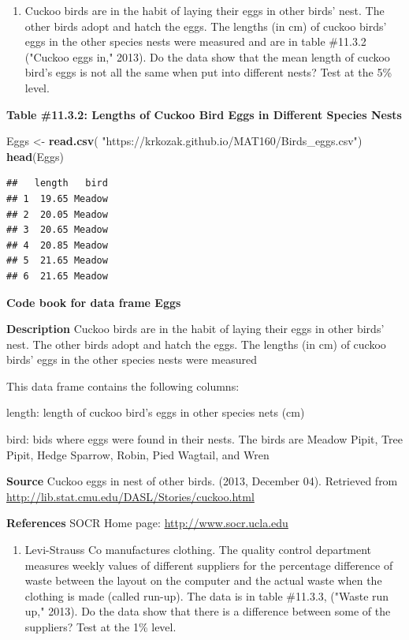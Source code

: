 \documentclass[
]{book}
\newenvironment{Shaded}{\begin{snugshade}}{\end{snugshade}}
\newcommand{\KeywordTok}[1]{\textcolor[rgb]{0.13,0.29,0.53}{\textbf{#1}}}
\newcommand{\NormalTok}[1]{#1}
\newcommand{\StringTok}[1]{\textcolor[rgb]{0.31,0.60,0.02}{#1}}
\providecommand{\tightlist}{%
  \setlength{\itemsep}{0pt}\setlength{\parskip}{0pt}}
\begin{document}
\begin{enumerate}
\def\labelenumi{\arabic{enumi}.}
\tightlist
\item
  Cuckoo birds are in the habit of laying their eggs in other birds' nest. The other birds adopt and hatch the eggs. The lengths (in cm) of cuckoo birds' eggs in the other species nests were measured and are in table \#11.3.2 ("Cuckoo eggs in," 2013). Do the data show that the mean length of cuckoo bird's eggs is not all the same when put into different nests? Test at the 5\% level.
\end{enumerate}

\textbf{Table \#11.3.2: Lengths of Cuckoo Bird Eggs in Different Species Nests}

\begin{Shaded}
\begin{Highlighting}[]
\NormalTok{Eggs <-}\StringTok{ }\KeywordTok{read.csv}\NormalTok{(}
  \StringTok{"https://krkozak.github.io/MAT160/Birds_eggs.csv"}\NormalTok{)}
\KeywordTok{head}\NormalTok{(Eggs)}
\end{Highlighting}
\end{Shaded}

\begin{verbatim}
##   length   bird
## 1  19.65 Meadow
## 2  20.05 Meadow
## 3  20.65 Meadow
## 4  20.85 Meadow
## 5  21.65 Meadow
## 6  21.65 Meadow
\end{verbatim}

\textbf{Code book for data frame Eggs}

\textbf{Description}
Cuckoo birds are in the habit of laying their eggs in other birds' nest. The other birds adopt and hatch the eggs. The lengths (in cm) of cuckoo birds' eggs in the other species nests were measured

This data frame contains the following columns:

length: length of cuckoo bird's eggs in other species nets (cm)

bird: bids where eggs were found in their nests. The birds are Meadow Pipit, Tree Pipit, Hedge Sparrow, Robin, Pied Wagtail, and Wren

\textbf{Source}
Cuckoo eggs in nest of other birds. (2013, December 04). Retrieved from
\url{http://lib.stat.cmu.edu/DASL/Stories/cuckoo.html}

\textbf{References}
SOCR Home page: \url{http://www.socr.ucla.edu}

\begin{enumerate}
\def\labelenumi{\arabic{enumi}.}
\setcounter{enumi}{1}
\tightlist
\item
  Levi-Strauss Co manufactures clothing. The quality control department measures weekly values of different suppliers for the percentage difference of waste between the layout on the computer and the actual waste when the clothing is made (called run-up). The data is in table \#11.3.3, ("Waste run up," 2013). Do the data show that there is a difference between some of the suppliers? Test at the 1\% level.
\end{enumerate}
\end{document}
